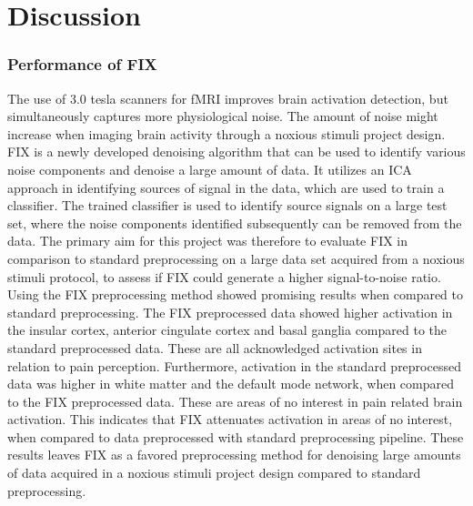 \chapter{Discussion}
\subsection*{Performance of FIX}
The use of 3.0 tesla scanners for fMRI improves brain activation detection, but simultaneously captures more physiological noise. The amount of noise might increase when imaging brain activity through a noxious stimuli project design. FIX is a newly developed denoising algorithm that can be used to identify various noise components and denoise a large amount of data. It utilizes an ICA approach in identifying sources of signal in the data, which are used to train a classifier. The trained classifier is used to identify source signals on a large test set, where the noise components identified subsequently can be removed from the data. The primary aim for this project was therefore to evaluate FIX in comparison to standard preprocessing on a large data set acquired from a noxious stimuli protocol, to assess if FIX could generate a higher signal-to-noise ratio. \\
Using the FIX preprocessing method showed promising results when compared to standard preprocessing. The FIX preprocessed data showed higher activation in the insular cortex, anterior cingulate cortex and basal ganglia compared to the standard preprocessed data. These are all acknowledged activation sites in relation to pain perception. Furthermore, activation in the standard preprocessed data was higher in white matter and the default mode network, when compared to the FIX preprocessed data. These are areas of no interest in pain related brain activation. This indicates that FIX attenuates activation in areas of no interest, when compared to data preprocessed with standard preprocessing pipeline. These results leaves FIX as a favored preprocessing method for denoising large amounts of data acquired in a noxious stimuli project design compared to standard preprocessing.

